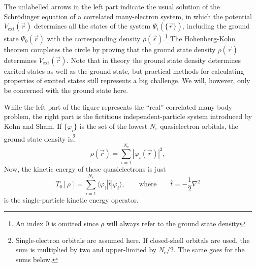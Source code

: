 \documentclass[11pt,bibliography=totoc,index=totoc]{scrbook}   %
\begin{document}
The unlabelled arrows in the left part indicate the usual solution of the Schrödinger equation of a correlated many-electron system, in which the potential $V_{\text{ext}}(\vec{r})$ determines all the states of the system $\Psi_i(\{\vec{r}\})$, including the ground state $\Psi_0(\vec{r})$ with the corresponding density $\rho(\vec{r})$.\footnote{An index 0 is omitted since $\rho$ will always refer to the ground state density} 
The Hohenberg-Kohn theorem completes the circle by proving that the ground state density $\rho(\vec{r})$ determines $V_{\text{ext}}(\vec{r})$.
Note that in theory the ground state density determines excited states as well as the ground state, but practical methods for calculating properties of excited states still represents a big challenge.\cite[136]{Martin:2004} We will, however, only be concerned with the ground state here.

While the left part of the figure represents the ``real'' correlated many-body problem, the right part is the fictitious independent-particle system introduced by Kohn and Sham. 
If $\{\varphi_i\}$ is the set of the lowest $N_e$ quasielectron orbitals, the ground state density is\footnote{Single-electron orbitals are assumed here. If closed-shell orbitals are used, the sum is multiplied by two and upper-limited by $N_e/2$. The same goes for the sums below.}
\begin{equation}
    \rho(\vec{r}) = \sum_{i=1}^{N_e} |\varphi_i(\vec{r})|^2,
    \label{eq:rho}
\end{equation}
Now, the kinetic energy of these quasielectrons is just
\begin{equation}
    T_0[\rho] = \sum_{i=1}^{N_e} \langle \varphi_i | \hat{t} | \varphi_i \rangle,\qquad\text{where}\qquad \hat{t} = -\frac12\nabla^2
  \label{eq:T0}
\end{equation}
is the single-particle kinetic energy operator.

\end{document}
